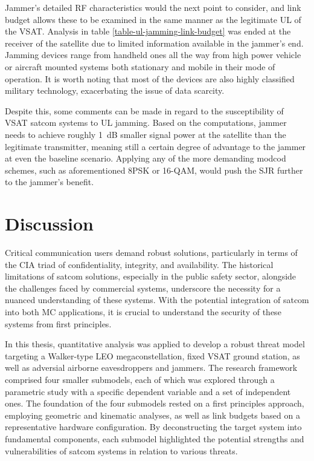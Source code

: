 \documentclass[english, 12pt, a4paper, elec, utf8, a-1b, online]{aaltothesis}
\begin{document}
Jammer's detailed RF characteristics would the next point to consider, and link budget allows these to be examined in the same manner as the legitimate UL of the VSAT.
Analysis in table \ref{table-ul-jamming-link-budget} was ended at the receiver of the satellite due to limited information available in the jammer's end.
Jamming devices range from handheld ones all the way from high power vehicle or aircraft mounted systems both stationary and mobile in their mode of operation.
It is worth noting that most of the devices are also highly classified military technology, exacerbating the issue of data scarcity.

Despite this, some comments can be made in regard to the susceptibility of VSAT satcom systems to UL jamming.
Based on the computations, jammer needs to achieve roughly \SI{1}{\deci\bel} smaller signal power at the satellite than the legitimate transmitter, meaning still a certain degree of advantage to the jammer at even the baseline scenario.
Applying any of the more demanding modcod schemes, such as aforementioned 8PSK or 16-QAM, would push the SJR further to the jammer's benefit.

\clearpage

\section{Discussion}

Critical communication users demand robust solutions, particularly in terms of the CIA triad of confidentiality, integrity, and availability.
The historical limitations of satcom solutions, especially in the public safety sector, alongside the challenges faced by commercial systems, underscore the necessity for a nuanced understanding of these systems.
With the potential integration of satcom into both MC applications, it is crucial to understand the security of these systems from first principles.

In this thesis, quantitative analysis was applied to develop a robust threat model targeting a Walker-type LEO megaconstellation, fixed VSAT ground station, as well as adversial airborne eavesdroppers and jammers. The research framework comprised four smaller submodels, each of which was explored through a parametric study with a specific dependent variable and a set of independent ones.
The foundation of the four submodels rested on a first principles approach, employing geometric and kinematic analyses, as well as link budgets based on a representative hardware configuration.
By deconstructing the target system into fundamental components, each submodel highlighted the potential strengths and vulnerabilities of satcom systems in relation to various threats.
\end{document}

